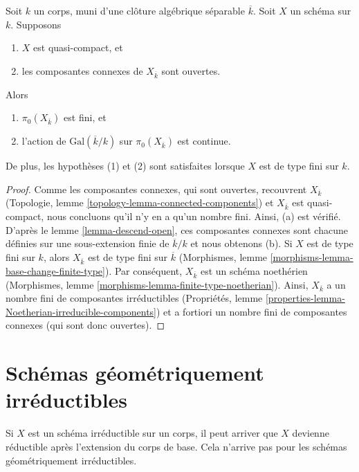 \begin{lemma}
\label{lemma-galois-action-connected-components-continuous}
Soit $k$ un corps, muni d'une clôture
algébrique séparable $\overline{k}$.
Soit $X$ un schéma sur $k$. Supposons
\begin{enumerate}
\item $X$ est quasi-compact, et \item les
composantes connexes de $X_{\overline{k}}$ sont ouvertes.
\end{enumerate}
Alors
\begin{enumerate}
\item [(a)] $\pi_0(X_{\overline{k}})$ est fini,
et \item [(b)] l'action de
$\text{Gal}(\overline{k}/k)$ sur $\pi_0(X_{\overline{k}})$ est continue.
\end{enumerate}
De plus, les hypothèses (1) et (2) sont
satisfaites lorsque $X$ est de type fini sur $k$.
\end{lemma}

\begin{proof}
Comme les composantes connexes, qui sont ouvertes, recouvrent
$X_{\overline{k}}$ (Topologie, lemme
\ref{topology-lemma-connected-components}) et
$X_{\overline{k}}$ est quasi-compact, nous concluons qu'il
n'y en a qu'un nombre fini. Ainsi, (a) est vérifié. D'après
le lemme \ref{lemma-descend-open}, ces composantes connexes
sont chacune définies sur une sous-extension finie de
$\overline{k}/k$ et nous obtenons (b). Si $X$ est de type
fini sur $k$, alors $X_{\overline{k}}$ est de type fini sur
$\overline{k}$ (Morphismes, lemme
\ref{morphisms-lemma-base-change-finite-type}). Par conséquent,
$X_{\overline{k}}$ est un schéma noethérien (Morphismes, lemme
\ref{morphisms-lemma-finite-type-noetherian}). Ainsi,
$X_{\overline{k}}$ a un nombre fini de composantes irréductibles
(Propriétés, lemme \ref{properties-lemma-Noetherian-irreducible-components})
et a fortiori un nombre fini de composantes connexes (qui sont donc ouvertes).
\end{proof}









\section{Schémas géométriquement irréductibles}
\label{section-geometrically-irreducible}

\noindent
Si $X$ est un schéma irréductible sur un corps, il peut arriver
que $X$ devienne réductible après l'extension du corps de base.
Cela n'arrive pas pour les schémas géométriquement irréductibles.

